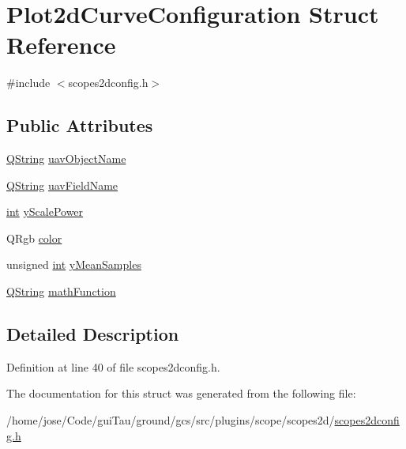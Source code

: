 \hypertarget{struct_plot2d_curve_configuration}{\section{Plot2d\-Curve\-Configuration Struct Reference}
\label{struct_plot2d_curve_configuration}
}


{\ttfamily \#include $<$scopes2dconfig.\-h$>$}

\subsection*{Public Attributes}
\begin{DoxyCompactItemize}
\item 
\hyperlink{group___u_a_v_objects_plugin_gab9d252f49c333c94a72f97ce3105a32d}{Q\-String} \hyperlink{group___scope_plugin_gaf7c7f2da1da17096fbffa1fdaa35d30e}{uav\-Object\-Name}
\item 
\hyperlink{group___u_a_v_objects_plugin_gab9d252f49c333c94a72f97ce3105a32d}{Q\-String} \hyperlink{group___scope_plugin_ga5f9e57253d839d8b0094e4360f61155f}{uav\-Field\-Name}
\item 
\hyperlink{ioapi_8h_a787fa3cf048117ba7123753c1e74fcd6}{int} \hyperlink{group___scope_plugin_ga42557670a9e1e7f792d3ecb795387425}{y\-Scale\-Power}
\item 
Q\-Rgb \hyperlink{group___scope_plugin_ga287675d34d68fc61f7de6bc82fed788d}{color}
\item 
unsigned \hyperlink{ioapi_8h_a787fa3cf048117ba7123753c1e74fcd6}{int} \hyperlink{group___scope_plugin_gabe6fab440d33b0a9cb4ad4db2950c26d}{y\-Mean\-Samples}
\item 
\hyperlink{group___u_a_v_objects_plugin_gab9d252f49c333c94a72f97ce3105a32d}{Q\-String} \hyperlink{group___scope_plugin_gac0be9d46aeaed52d3ee1e796946969ed}{math\-Function}
\end{DoxyCompactItemize}


\subsection{Detailed Description}


Definition at line 40 of file scopes2dconfig.\-h.



The documentation for this struct was generated from the following file\-:\begin{DoxyCompactItemize}
\item 
/home/jose/\-Code/gui\-Tau/ground/gcs/src/plugins/scope/scopes2d/\hyperlink{scopes2dconfig_8h}{scopes2dconfig.\-h}\end{DoxyCompactItemize}
